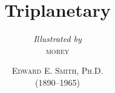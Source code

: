 \titlehead{}
\subject{}
\title{\Huge  Triplanetary}
\subtitle{\normalsize \textit{Illustrated by}\\\textsc{morey}}
\author{\scshape Edward E. Smith, Ph.D.\\(1890--1965)}
\date{}
\publishers{\large 1934}